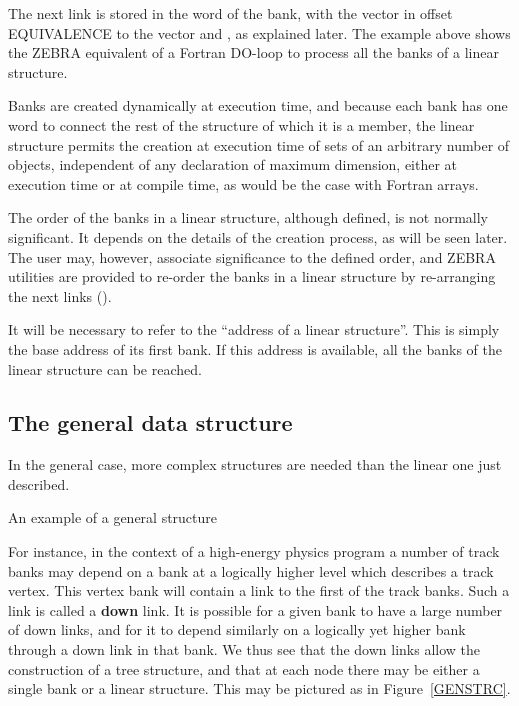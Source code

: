 \newpage

The next link is stored in the word  of the bank,
with the vector 
in offset EQUIVALENCE to the vector  and , as explained later.
The example above shows the ZEBRA equivalent of a Fortran DO-loop to process
all the banks of a linear structure.

Banks are created dynamically at execution time, and because each
bank has one word to connect the rest of the structure of which it is a
member, the linear structure permits the creation at
execution time of sets of an arbitrary number of objects,
independent of any declaration of maximum dimension, either at
execution time or at compile time, as would be the case with Fortran
arrays.

The order of the banks in a linear structure, although defined, is not
normally significant. It depends on the details of the creation process,
as will be seen later. The user may, however, associate significance to
the defined order, and ZEBRA utilities are provided to re-order the
banks in a linear structure by re-arranging the next links ().

It will be necessary to refer to the
``address of a linear structure''.
This is simply the base address of its first bank. If this address is
available, all the banks of the linear structure can be reached.
\subsection{The general data structure}

In the general case, more complex structures are needed than the linear
one just described. 

\begin{Fighere}
\begin{center}
\mbox{}
\end{center}
\caption{An example of a general structure}
\label{GENSTRC}
\end{Fighere}

For instance, in the context of a high-energy
physics program a number of track banks may depend on a bank at a
logically higher level which
describes a track vertex. 
This vertex bank will
contain a link to the first of the track banks. 
Such a link is called a {\bf down} link.
It is possible for a given bank to have a large number of
down links, and for it to depend similarly on a logically yet higher bank
through a down link in that bank.
We thus see that the down links allow the construction of
a tree structure, and that at each node there may be either a
single bank or a linear structure. This may be pictured as in
Figure~\ref{GENSTRC}.

